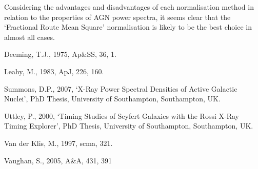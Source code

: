 \documentclass[letters,useAMS,usenatbib]{samnote}
\begin{document}
Considering the advantages and disadvantages of each normalisation method in relation to the properties of AGN power spectra, it seems clear that the `Fractional Route Mean Square' normalisation is likely to be the best choice in almost all cases.

\begin{thebibliography}{99}

 Deeming, T.J., 1975, Ap\&SS, 36, 1.

 Leahy, M., 1983, ApJ, 226, 160.

 Summons, D.P., 2007, `X-Ray Power Spectral Densities of Active Galactic Nuclei', PhD Thesis, University of Southampton, Southampton, UK.

 Uttley, P., 2000, `Timing Studies of Seyfert Galaxies with the Rossi X-Ray Timing Explorer', PhD Thesis, University of Southampton, Southampton, UK.

 Van der Klis, M., 1997, scma, 321.


 Vaughan, S., 2005, A\&A, 431, 391

\end{thebibliography}


\label{lastpage}
\end{document}
